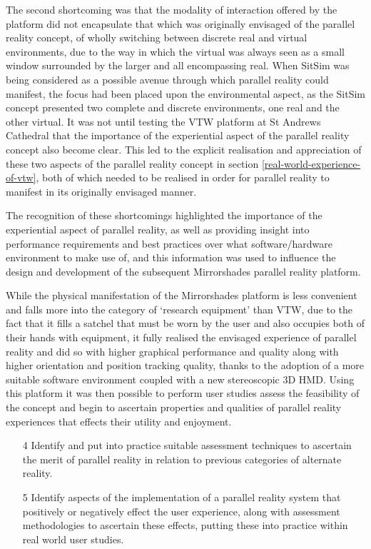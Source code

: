 The second shortcoming was that the modality of interaction offered by the platform did not encapsulate that which was originally envisaged of the parallel reality concept, of wholly switching between discrete real and virtual environments, due to the way in which the virtual was always seen as a small window surrounded by the larger and all encompassing real. When SitSim was being considered as a possible avenue through which parallel reality could manifest, the focus had been placed upon the environmental aspect, as the SitSim concept presented two complete and discrete environments, one real and the other virtual. It was not until testing the VTW platform at St Andrews Cathedral that the importance of the experiential aspect of the parallel reality concept also become clear. This led to the explicit realisation and appreciation of these two aspects of the parallel reality concept in section \ref{real-world-experience-of-vtw}, both of which needed to be realised in order for parallel reality to manifest in its originally envisaged manner.

The recognition of these shortcomings highlighted the importance of the experiential aspect of parallel reality, as well as providing insight into performance requirements and best practices over what software/hardware environment to make use of, and this information was used to influence the design and development of the subsequent Mirrorshades parallel reality platform.

While the physical manifestation of the Mirrorshades platform is less convenient and falls more into the category of `research equipment' than VTW, due to the fact that it fills a satchel that must be worn by the user and also occupies both of their hands with equipment, it fully realised the envisaged experience of parallel reality and did so with higher graphical performance and quality along with higher orientation and position tracking quality, thanks to the adoption of a more suitable software environment coupled with a new stereoscopic 3D HMD. Using this platform it was then possible to perform user studies assess the feasibility of the concept and begin to ascertain properties and qualities of parallel reality experiences that effects their utility and enjoyment.

\begin{enumerate}	
	\item[4] Identify and put into practice suitable assessment techniques to ascertain the merit of parallel reality in relation to previous categories of alternate reality.
	\item[5] Identify aspects of the implementation of a parallel reality system that positively or negatively effect the user experience, along with assessment methodologies to ascertain these effects, putting these into practice within real world user studies.
\end{enumerate}

